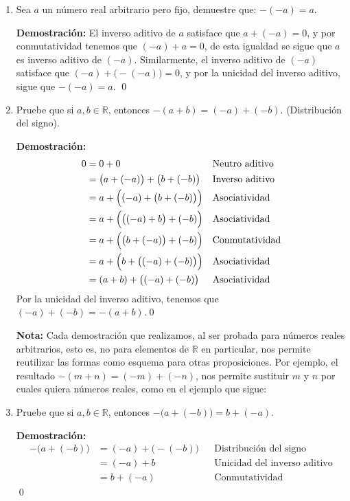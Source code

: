 \documentclass[11pt]{article}
\newcommand{\R}{\mathbb{R}}
\begin{document}
\begin{enumerate}[label=\alph*)]
    \item Sea $a$ un número real arbitrario pero fijo, demuestre que: $-(-a)=a$.
        
    \textbf{Demostración:} El inverso aditivo de $a$ satisface que $a + (-a) = 0$, y por conmutatividad tenemos que $(-a) + a = 0$, de esta igualdad se sigue que $a$ es inverso aditivo de $(-a)$. Similarmente, el inverso aditivo de $(-a)$ satisface que $(-a) + \bigl(-(-a)\bigr) = 0$, y por la unicidad del inverso aditivo, sigue que $-(-a) = a$. \qed

    \item Pruebe que si $a,b\in \R$, entonces $-(a+b)=(-a)+(-b)$. (Distribución del signo).

    \textbf{Demostración:} \begin{align*}
    0 &= 0 + 0 && \text{Neutro aditivo} \\
    &= \bigl(a+(-a)\bigr) + \bigl(b + (-b)\bigr) && \text{Inverso aditivo} \\
    &= a + \Bigl((-a)+ \bigl(b + (-b)\bigr)\Bigr) && \text{Asociatividad} \\
    &= a + \Bigl( \bigl((-a)+b\bigr) +(-b)\Bigr) && \text{Asociatividad} \\
    &= a + \Bigl( \bigl(b+(-a)\bigr) +(-b)\Bigr) && \text{Conmutatividad} \\
    &= a + \Bigl( b + \bigl( (-a)+(-b) \bigr) \Bigr) && \text{Asociatividad} \\
    &= (a+b) + \bigl((-a)+ (-b)\bigr) && \text{Asociatividad}
    \end{align*}
    Por la unicidad del inverso aditivo, tenemos que $(-a)+ (-b)=-(a+b)$.\qed

    \textbf{Nota:} Cada demostración que realizamos, al ser probada para números reales arbitrarios, esto es, no para elementos de $\R$ en particular, nos permite reutilizar las formas como esquema para otras proposiciones. Por ejemplo, el resultado $-(m+n)=(-m)+(-n)$, nos permite sustituir $m$ y $n$ por cuales quiera números reales, como en el ejemplo que sigue:

    \item Pruebe que si $a,b\in \R$, entonces $-\bigl(a+(-b)\bigr)=b+(-a)$.

    \textbf{Demostración:} \begin{align*}
    -\bigl(a+(-b)\bigr)&= (-a) + \bigl(-(-b)\bigr) &&\text{Distribución del signo} \\
    &= (-a) + b &&\text{Unicidad del inverso aditivo} \\
    &= b +(-a) &&\text{Conmutatividad}
    \end{align*} \qed

\end{enumerate}
\end{document}
